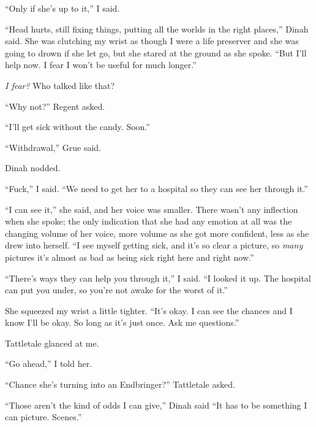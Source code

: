 ``Only if she's up to it,'' I said.



``Head hurts, still fixing things, putting all the worlds in the right places,'' Dinah said.  She was clutching my wrist as though I were a life preserver and she was going to drown if she let go, but she stared at the ground as she spoke.  ``But I'll help now.  I fear I won't be useful for much longer.''



\emph{I fear?}  Who talked like that?



``Why not?'' Regent asked.



``I'll get sick without the candy.  Soon.''



``Withdrawal,'' Grue said.



Dinah nodded.



``Fuck,'' I said.  ``We need to get her to a hospital so they can see her through it.''



``I can see it,'' she said, and her voice was smaller.  There wasn't any inflection when she spoke; the only indication that she had any emotion at all was the changing volume of her voice, more volume as she got more confident, less as she drew into herself.  ``I see myself getting sick, and it's so clear a picture, so \emph{many} pictures it's almost as bad as being sick right here and right now.''



``There's ways they can help you through it,'' I said.  ``I looked it up.  The hospital can put you under, so you're not awake for the worst of it.''



She squeezed my wrist a little tighter.  ``It's okay.  I can see the chances and I know I'll be okay.  So long as it's just once.  Ask me questions.''



Tattletale glanced at me.



``Go ahead,'' I told her.



``Chance she's turning into an Endbringer?'' Tattletale asked.



``Those aren't the kind of odds I can give,'' Dinah said  ``It has to be something I can picture.  Scenes.''



